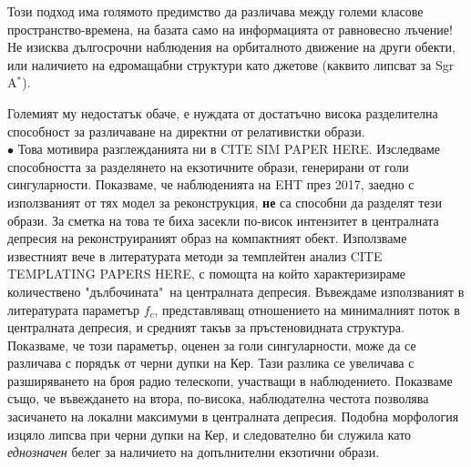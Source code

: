Този подход има голямото предимство да различава между големи класове пространство-времена, на базата само на информацията от равновесно лъчение! Не изисква дългосрочни наблюдения на орбиталното движение на други обекти, или наличието на едромащабни структури като джетове (каквито липсват за Sgr A$^*$).
\newpage

Големият му недостатък обаче, е нуждата от достатъчно висока разделителна способност за различаване на директни от релативистки образи. \\\newline
$\bullet$ Това мотивира разглежданията ни в CITE SIM PAPER HERE. Изследваме способността за разделянето на екзотичните образи, генерирани от голи сингуларности. Показваме, че наблюденията на EHT през 2017, заедно с използваният от тях модел за реконструкция, \textbf{не} са способни да разделят тези образи. За сметка на това те биха засекли по-висок интензитет в централната депресия на реконструираният образ на компактният обект. Използваме известният вече в литературата методи за темплейтен анализ CITE TEMPLATING PAPERS HERE, с помощта на който характеризираме количествено "дълбочината"$\,$ на централната депресия. Въвеждаме използваният в литературата параметър $f_c$, представляващ отношението на минималният поток в централната депресия, и средният такъв за пръстеновидната структура. Показваме, че този параметър, оценен за голи сингуларности, може да се различава с порядък от черни дупки на Кер. Тази разлика се увеличава с разширяването на броя радио телескопи, участващи в наблюдението. Показваме също, че въвеждането на втора, по-висока, наблюдателна честота позволява засичането на локални максимуми в централната депресия. Подобна морфология изцяло липсва при черни дупки на Кер, и следователно би служила като \emph{еднозначен} белег за наличието на допълнителни екзотични образи.
\lfoot{}